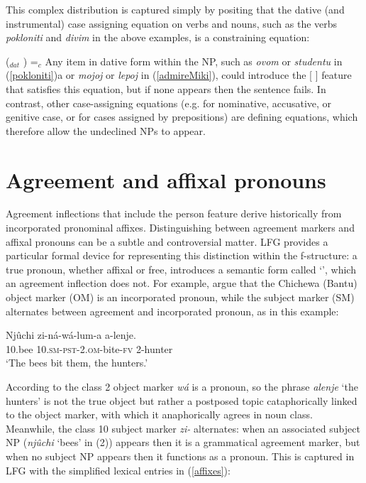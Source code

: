 \noindent
This complex distribution is captured simply by positing that the dative (and instrumental) case assigning equation on verbs and nouns, such as the verbs \textit{pokloniti} and \textit{divim} in the above examples, is a constraining equation:

\ea
(\up {}$_{dat}$ ) =$_c$ 
\z
Any item in dative form within the NP, such as \textit{ovom} or \textit{studentu} in (\ref{pokloniti})a or \textit{mojoj} or \textit{lepoj} in (\ref{admireMiki}), could introduce the [ ] feature that satisfies this equation, but if none appears then the sentence fails.  In contrast, other case-assigning equations (e.g. for nominative, accusative, or genitive case, or for cases assigned by prepositions) are defining equations, which therefore allow the undeclined NPs to appear.  

\section{Agreement and affixal pronouns}

Agreement inflections that include the person feature derive historically from incorporated pronominal affixes.  Distinguishing between agreement markers and affixal pronouns can be a subtle and controversial matter.  LFG provides a particular formal device for representing this distinction within the f-structure:  a true pronoun, whether affixal or free, introduces a semantic form called `', which an agreement inflection does not.  
For example, \citet{bresnan+mchombo:1987} argue that the Chichewa (Bantu) object marker (OM) is an incorporated pronoun, while the subject marker (SM) alternates between agreement and incorporated pronoun, as in this example: 


 \begin{exe} 
\ex	\label{bees}
{\gll Nj\^{u}chi   zi-n\'a-w\'{a}-lum-a  a-lenje. \\
 10.bee 10.\textsc{sm}-\textsc{pst}-2.\textsc{om}-bite-\textsc{fv} 2-hunter \\
\glt `The bees bit them, the hunters.' }
\end{exe}

\noindent
According to \citet{bresnan+mchombo:1987}  the class 2 object marker \textit{w\'{a}} is a pronoun, so the phrase \textit{alenje} `the hunters' is not the true object but rather a postposed topic cataphorically linked to the object marker, with which it anaphorically agrees in noun class.  Meanwhile, the class 10 subject marker \textit{zi-} alternates: when an associated subject NP (\textit{njûchi} ‘bees’ in (2)) appears then it is a grammatical agreement marker, but when no subject NP appears then it functions as a pronoun.  This is captured in LFG with the simplified lexical entries in (\ref{affixes}):

